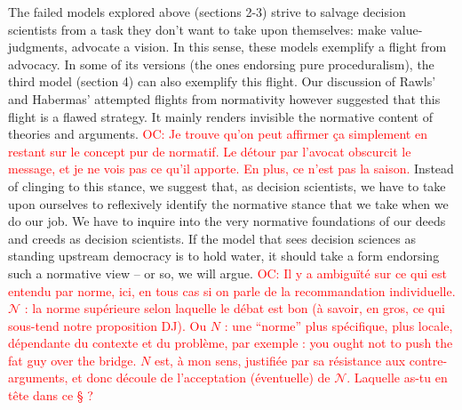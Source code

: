 \documentclass[preprint, french, english, 11pt]{elsarticle}%
\newcommand{\commentOC}[1]{\textcolor{red}{OC: #1}}
\begin{document}
The failed models explored above (sections 2-3) strive to salvage decision scientists from a task they don’t want to take upon themselves: make value-judgments, advocate a vision. In this sense, these models exemplify a flight from advocacy. In some of its versions (the ones endorsing pure proceduralism), the third model (section 4) can also exemplify this flight. 
Our discussion of Rawls' and Habermas' attempted flights from normativity however suggested that this flight is a flawed strategy. It mainly renders invisible the normative content of theories and arguments. 
\commentOC{Je trouve qu’on peut affirmer ça simplement en restant sur le concept pur de normatif. Le détour par l’avocat obscurcit le message, et je ne vois pas ce qu’il apporte. En plus, ce n’est pas la saison.}
Instead of clinging to this stance, we suggest that, as decision scientists, we have to take upon ourselves to reflexively identify the normative stance that we take when we do our job. We have to inquire into the very normative foundations of our deeds and creeds as decision scientists. If the model that sees decision sciences as standing upstream democracy is to hold water, it should take a form endorsing such a normative view -- or so, we will argue.
\commentOC{Il y a ambiguïté sur ce qui est entendu par norme, ici, en tous cas si on parle de la recommandation individuelle. $\mathscr{N}$ : la norme supérieure selon laquelle \og{}le débat est bon\fg{} (à savoir, en gros, ce qui sous-tend notre proposition DJ). Ou $N$ : une “norme” plus spécifique, plus locale, dépendante du contexte et du problème, par exemple : \og{}you ought not to push the fat guy over the bridge\fg{}. $N$ est, à mon sens, justifiée par sa résistance aux contre-arguments, et donc découle de l’acceptation (éventuelle) de $\mathscr{N}$. Laquelle as-tu en tête dans ce § ?}
\end{document}
